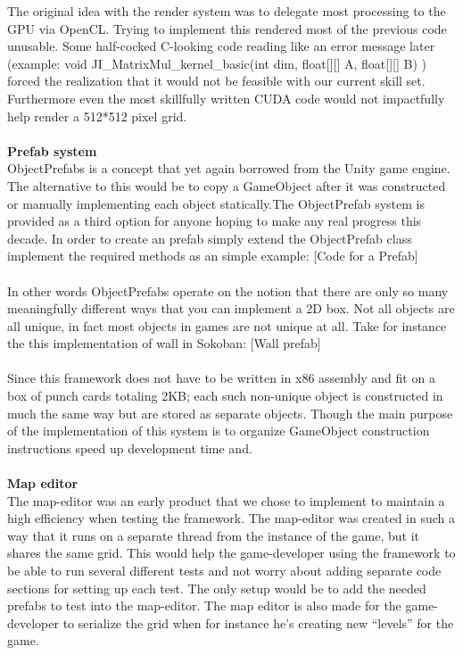 \documentclass[main.tex]{subfiles}
\begin{document}
The original idea with the render system was to delegate most processing to the GPU via OpenCL. Trying to implement this rendered most of the previous code unusable. Some half-cocked C-looking code reading like an error message later (example: void JI\_MatrixMul\_kernel\_basic(int dim, float[][] A, float[][] B){} )  forced the realization that it would not be feasible with our current skill set. Furthermore even the most skillfully written CUDA code would not impactfully help render a 512*512 pixel grid.
\\ \\
\textbf{Prefab system} \\%
ObjectPrefabs is a concept that yet again borrowed from the Unity game engine. 
The alternative to this would be to copy a GameObject after it was constructed or manually implementing each object statically.The ObjectPrefab system is provided as a third option for anyone hoping to make any real progress this decade. In order to create an prefab simply extend the ObjectPrefab class implement the required methods as an simple example:
	[Code for a Prefab]
\\ \\
In other words ObjectPrefabs operate on the notion that there are only so many meaningfully different ways that you can implement a 2D box. Not all objects are all unique, in fact most objects in games are not unique at all. Take for instance the this implementation of wall in Sokoban: 
	[Wall prefab]
\\ \\
Since this framework does not have to be written in x86 assembly and fit on a box of punch cards totaling 2KB; each such non-unique object is constructed in much the same way but are stored as separate objects. Though the main purpose of the implementation of this system is to organize GameObject construction instructions speed up development time and.
\\ \\
\textbf{Map editor} \\%
The map-editor was an early product that we chose to implement to maintain a high efficiency when testing the framework. The map-editor was created in such a way that it runs on a separate thread from the instance of the game, but it shares the same grid. This would help the game-developer using the framework to be able to run several different tests and not worry about adding separate code sections for setting up each test. The only setup would be to add the needed prefabs to test into the map-editor. The map editor is also made for the game-developer to serialize the grid when for instance he’s creating new “levels” for the game.
\end{document}
